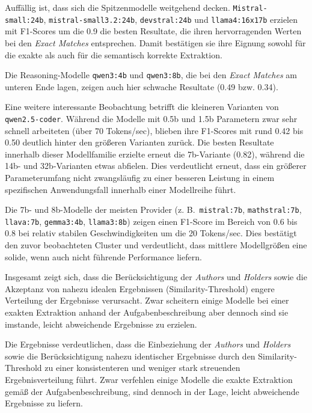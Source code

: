 Auffällig ist, dass sich die Spitzenmodelle weitgehend decken. \texttt{Mistral-small:24b}, \texttt{mistral-small3.2:24b}, \texttt{devstral:24b} und \texttt{llama4:16x17b} erzielen mit F1-Scores um die \num{0.9} die besten Resultate, die ihren hervorragenden Werten bei den \textit{Exact Matches} entsprechen.
Damit bestätigen sie ihre Eignung sowohl für die exakte als auch für die semantisch korrekte Extraktion.

Die Reasoning-Modelle \texttt{qwen3:4b} und \texttt{qwen3:8b}, die bei den \textit{Exact Matches} am unteren Ende lagen, zeigen auch hier schwache Resultate (\num{0.49} bzw. \num{0.34}).

Eine weitere interessante Beobachtung betrifft die kleineren Varianten von \texttt{qwen2.5-coder}.
Während die Modelle mit 0.5b und 1.5b Parametern zwar sehr schnell arbeiteten (über 70 Tokens/sec), blieben ihre F1-Scores mit rund \num{0.42} bis \num{0.50} deutlich hinter den größeren Varianten zurück.
Die besten Resultate innerhalb dieser Modellfamilie erzielte erneut die 7b-Variante (\num{0.82}), während die 14b- und 32b-Varianten etwas abfielen.
Dies verdeutlicht erneut, dass ein größerer Parameterumfang nicht zwangsläufig zu einer besseren Leistung in einem spezifischen Anwendungsfall innerhalb einer Modellreihe führt.

Die 7b- und 8b-Modelle der meisten Provider (z. B.\ \texttt{mistral:7b}, \texttt{mathstral:7b}, \texttt{llava:7b}, \texttt{gemma3:4b}, \texttt{llama3:8b}) zeigen einen F1-Score im Bereich von \num{0.6} bis \num{0.8} bei relativ stabilen Geschwindigkeiten um die \num{20} Tokens/sec.
Dies bestätigt den zuvor beobachteten Cluster und verdeutlicht, dass mittlere Modellgrößen eine solide, wenn auch nicht führende Performance liefern.

Insgesamt zeigt sich, dass die Berücksichtigung der \textit{Authors} und \textit{Holders} sowie die Akzeptanz von nahezu idealen Ergebnissen (Similarity-Threshold) engere Verteilung der Ergebnisse verursacht.
Zwar scheitern einige Modelle bei einer exakten Extraktion anhand der Aufgabenbeschreibung aber dennoch sind sie imstande, leicht abweichende Ergebnisse zu erzielen.

Die Ergebnisse verdeutlichen, dass die Einbeziehung der \textit{Authors} und \textit{Holders} sowie die Berücksichtigung nahezu identischer Ergebnisse durch den Similarity-Threshold zu einer konsistenteren und weniger stark streuenden Ergebnisverteilung führt.
Zwar verfehlen einige Modelle die exakte Extraktion gemäß der Aufgabenbeschreibung, sind dennoch in der Lage, leicht abweichende Ergebnisse zu liefern.

